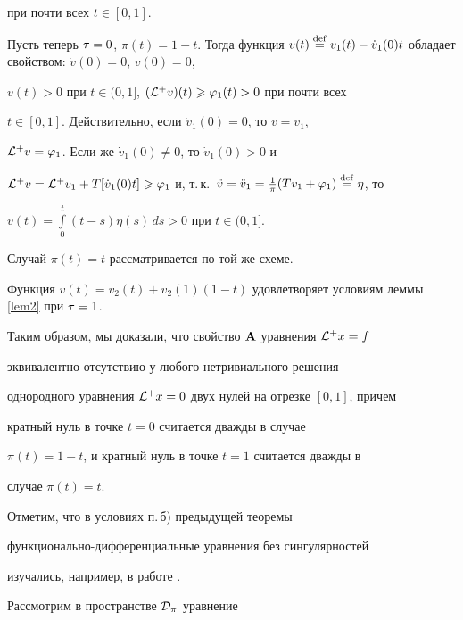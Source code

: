 \begin{pf}
при почти всех $t\in[0,1]$.





Пусть теперь $\t=0$, $\pi(t)=1-t$. Тогда функция $v(t)\df


v_1(t)-\Dot v_1(0)t$ обладает свойством: $\Dot v(0)=0$, $v(0)=0$,


$v(t)>0$ при $t\in(0,1]$, $({\cal L}^+ v)(t)\geqslant\varphi_1(t)>0$ при почти всех


$t\in[0,1]$. Действительно, если $\Dot v_1(0)=0$, то $v=v_1$,


${\cal L}^+ v=\varphi_1$. Если же $\Dot v_1(0)\ne0$, то $\Dot v_1(0)>0$ и


$\L^+ v=\L^+ v_1+T[\Dot v_1(0)t]\ge \phi_1$ и, т.\,к.~$\Ddot v=\Ddot


v_1=\frac{1}{\pi}(Tv_1+\phi_1)\df\eta$, то


$v(t)=\int\limits_0^t(t-s)\eta(s)\,ds>0$ при $t\in(0,1]$.





Случай $\pi(t)=t$ рассматривается по той же схеме.


Функция $v(t)=v_2(t)+\Dot


v_2(1)(1-t)$ удовлетворяет условиям леммы \ref{lem2} при $\t=1$.


\end{pf}





Таким образом, мы доказали, что свойство $\bold A$ уравнения ${\cal L}^+x=f$


эквивалентно отсутствию у любого нетривиального решения


однородного уравнения ${\cal L}^+x=0$ двух нулей на отрезке $[0,1]$, причем


кратный нуль в точке $t=0$ считается дважды в случае


$\pi(t)=1-t$, и кратный нуль в точке $t=1$ считается дважды в


случае $\pi(t)=t$.





Отметим, что в условиях п.\,б) предыдущей теоремы


функционально-дифференциальные уравнения без сингулярностей


изучались, например, в работе \cite{Hen}.





Рассмотрим в пространстве ${\cal D}_\pi$ уравнение


